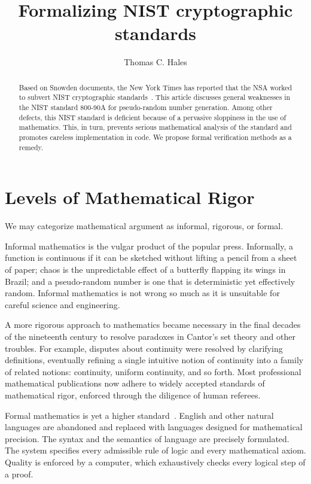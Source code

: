 \documentclass[11pt]{amsart} %
\begin{document}
\title{Formalizing NIST cryptographic standards}
\author{Thomas C. Hales} 
\maketitle


\begin{abstract} Based on Snowden documents, the New York Times has reported that 
the NSA worked to subvert NIST cryptographic standards~\cite{NYT-backdoor}.  
This article discusses general weaknesses in the NIST standard 800-90A for pseudo-random number
generation.
Among other defects, this NIST standard is deficient because of a pervasive sloppiness in the use of
mathematics.
This, in turn, prevents serious mathematical analysis of the standard and promotes careless implementation in code.
We propose formal verification methods as a remedy.
\end{abstract}

\section{Levels of Mathematical Rigor}

We may categorize mathematical argument as 
 informal,  rigorous, or formal.


Informal mathematics is the vulgar product of the popular press.
Informally, a function is continuous if it can be sketched without lifting a pencil from a sheet of paper;
chaos is the unpredictable
effect of a butterfly flapping its wings in Brazil; and 
a pseudo-random number is one that is deterministic yet effectively random.
Informal mathematics is not wrong so much as it is unsuitable for careful science
and engineering.

 A more rigorous approach
to mathematics became necessary in the final decades of the nineteenth century  
to resolve 
paradoxes in Cantor's set theory and other troubles.
For example, disputes about continuity were resolved by clarifying definitions,
eventually refining a single intuitive notion of continuity into a family of related notions: 
continuity, uniform continuity, 
and so forth.  Most professional mathematical publications now adhere to widely accepted 
standards of mathematical
rigor,  enforced through the  diligence of human referees.

Formal mathematics is yet a higher standard~\cite{Hales:2008:formal}.   English and other natural languages are abandoned and 
replaced with languages designed for mathematical
precision. The syntax and the semantics of language are precisely formulated.
The system specifies
every admissible rule of logic and  every mathematical axiom.  
Quality is enforced by a computer, which exhaustively checks every logical step of a proof.
\end{document}
